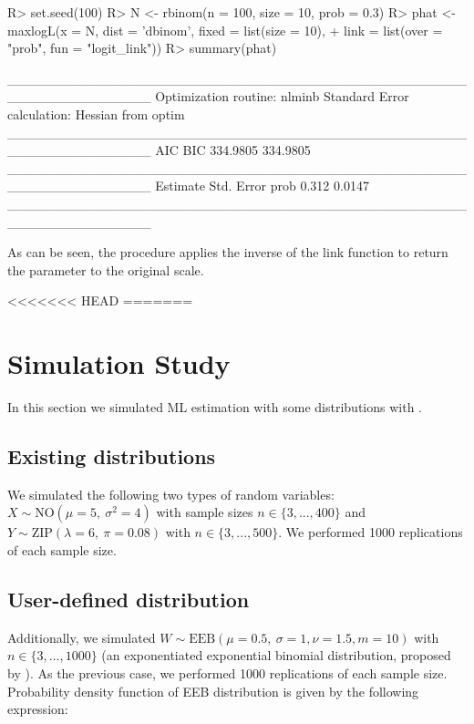\documentclass[nojss]{jss}
\begin{document}
\begin{Schunk}
\begin{Sinput}
R> set.seed(100)
R> N <- rbinom(n = 100, size = 10, prob = 0.3)
R> phat <- maxlogL(x = N, dist = 'dbinom', fixed = list(size = 10),
+                  link = list(over = "prob", fun = "logit_link"))
R> summary(phat)
\end{Sinput}
\begin{Soutput}
_______________________________________________________________
Optimization routine: nlminb 
Standard Error calculation: Hessian from optim 
_______________________________________________________________
       AIC      BIC
  334.9805 334.9805
_______________________________________________________________
     Estimate  Std. Error
prob     0.312     0.0147
_______________________________________________________________
\end{Soutput}
\end{Schunk}

As can be seen, the procedure applies the inverse of the link function to return the parameter to the original scale.

<<<<<<< HEAD
=======
\section{Simulation Study}

In this section we simulated ML estimation with some distributions with .

\subsection{Existing distributions}
We simulated the following two types of random variables: $X \sim \text{NO}(\mu=5,\: \sigma^2=4)$ with sample sizes $n \in \lbrace 3,...,400 \rbrace$ and $Y \sim \text{ZIP}(\lambda=6,\: \pi=0.08)$ with $n \in \lbrace 3,...,500 \rbrace$. We performed 1000 replications of each sample size.

\subsection{User-defined distribution}
Additionally, we simulated $W \sim \text{EEB}(\mu=0.5,\: \sigma=1, \nu=1.5, m=10)$ with $n \in \lbrace 3,...,1000 \rbrace$ (an exponentiated exponential binomial distribution, proposed by \cite{Bakouch2012}). As the previous case, we performed 1000 replications of each sample size. Probability density function of EEB distribution is given by the following expression:
\end{document}
